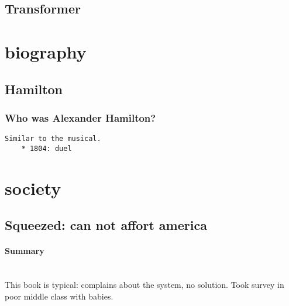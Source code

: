 \documentclass[12pt]{report}
\begin{document}
\subsection{Transformer}

\section{biography}
\subsection{Hamilton}
\subsubsection{Who was Alexander Hamilton?}
\def \year{Pam Pollack}
\begin{verbatim}
Similar to the musical.
    * 1804: duel 
\end{verbatim}

\section{society}
\subsection{Squeezed: can not affort america}
\paragraph{Summary}~\\
This book is typical: complains about the system, no solution. Took survey in poor middle class with babies.
\end{document}
